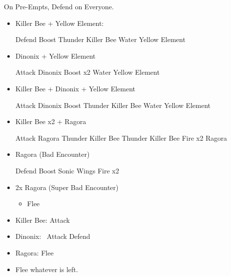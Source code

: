 \begin{encounters}
	On Pre-Empts, Defend on Everyone.
	\begin{itemize}
		\item Killer Bee + Yellow Element:
		      \begin{itemize}
			      \tidusf Defend
			      \summon{\valefor}
			      \valeforf Boost
			      \valeforf Thunder Killer Bee
		            \valeforf Water Yellow Element
		      \end{itemize}
		\item Dinonix + Yellow Element
		      \begin{itemize}
			      \tidusf Attack Dinonix
			      \summon{\valefor}
			      \valeforf Boost x2
			      \valeforf Water Yellow Element
		      \end{itemize}
		\item Killer Bee + Dinonix + Yellow Element
		      \begin{itemize}
			      \tidusf Attack Dinonix
			      \summon{\valefor}
			      \valeforf Boost
			      \valeforf Thunder Killer Bee
			      \valeforf Water Yellow Element
		      \end{itemize}
		\item Killer Bee x2 + Ragora
			\begin{itemize}
				\tidusf Attack Ragora
				\summon{\valefor}
				\valeforf Thunder Killer Bee
				\valeforf Thunder Killer Bee
				\valeforf Fire x2 Ragora
			\end{itemize}
		\item Ragora (Bad Encounter)
		      \begin{itemize}
			      \tidusf Defend
			      \summon{\valefor}
			      \valeforf Boost
			      \valeforf Sonic Wings
			      \valeforf Fire x2
		      \end{itemize}
		\item 2x Ragora (Super Bad Encounter)
		      \begin{itemize}
			      \tidusf Defend
			      \summon{\valefor}
			      \valeforf Boost
			      \valeforf Dismiss
			      \wakkaf Defend
			      \item Flee
		      \end{itemize}
	\end{itemize}
\end{encounters}
\begin{encounters}
	\begin{itemize}
		\item Killer Bee: \wakka Attack
		\item Dinonix: \tidus\ Attack
		 \yunaf Defend
		\item Ragora: Flee
		\item Flee whatever is left.
	\end{itemize}
\end{encounters}
